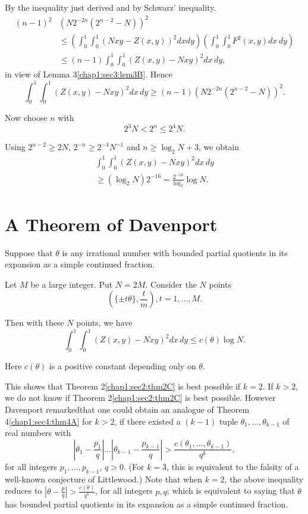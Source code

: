 By the inequality just derived and by Schwarz' inequality.
\begin{align*}
 (n-1)^{2} &(N2^{-2n} (2^{n-2} - N))^{2}\\ & \leq \left(\int_{0}^{1} \int_{0}^{1} (Nxy -Z(x, y))^{2} dx dy\right) \left(\int_{0}^{1} \int_{0}^{1} F^{2} (x, y)dx \, dy\right)\\
 & \leq (n-1) \int_{0}^{1} \int_{0}^{1} (Z(x, y) - Nxy)^{2} dx \, dy,
\end{align*}\pageoriginale
in view of Lemma 3\ref{chap1:sec3:lem3B}. Hence
$$
\int_{0}^{1} \int_{0}^{1} (Z(x, y) - Nxy)^{2} dx \, dy \geq (n-1)(N2^{-2n} (2^{n-2} - N))^{2}.
$$

Now choose $n$ with
$$
2^{3}N < 2^{n} \leq 2^{4}N.
$$

Using $2^{n-2} \geq 2N$, $2^{-n} \geq 2^{-4}N^{-1}$ and $n \geq \log_{2} N + 3$, we obtain
\begin{gather*}
\int_{0}^{1} \int_{0}^{1} (Z(x, y) - Nxy)^{2} dx \, dy\\
\geq (\log_{2} N)2^{-16} = \frac{2^{-16}}{\log_{2}} \log N.
\end{gather*}

\section{A Theorem of Davenport}\label{chap1:sec4}

\begin{theorem}[ \cite{3}]\label{chap1:sec4:thm4A}
Suppose that $\theta$ is any irrational number with bounded partial quotients in its expansion as a simple continued fraction.
\end{theorem}

Let $M$ be a large integer. Put $N = 2M$. Consider the $N$ points
$$
(\{\pm t \theta \}, \frac{t}{m}), t = 1, \ldots, M.
$$

Then with these $N$ points, we have
$$
\int_{0}^{1} \int_{0}^{1} (Z(x, y) - Nxy)^{2} dx \, dy \leq c(\theta) \log N.
$$

Here $c(\theta)$ is a positive constant depending only on $\theta$.

This shows that Theorem 2\ref{chap1:sec2:thm2C} is best possible if $k = 2$. If $k > 2$, we do not know if Theorem 2\ref{chap1:sec2:thm2C} is best possible. However Davenport remarked\pageoriginale that one could obtain an analogue of Theorem 4\ref{chap1:sec4:thm4A} for $k > 2$, if there existed a $(k-1)$ tuple $\theta_{1}, \ldots, \theta_{k-1}$ of real numbers with
$$
\left|\theta_{1} - \frac{p_{1}}{q}\right|\ldots\left|\theta_{k-1} - \frac{p_{k-1}}{q}\right| > \frac{c(\theta_{1}, \ldots, \theta_{k-1})}{q^{k}},
$$
for all integers $p_{1}, \ldots, p_{k-1}$, $q > 0$. (For $k = 3$, this is equivalent to the falsity of a well-known conjecture of Littlewood.) Note that when $k = 2$, the above inequality reduces to $\left|\theta - \frac{p}{q}\right| > \frac{c(\theta)}{q^{k}}$, for all integers $p, q$; which is equivalent to saying that $\theta$ has bounded partial quotients in its expansion as a simple continued fraction.

